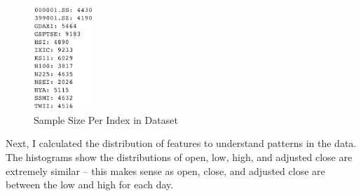 \documentclass[a4paper, 11pt]{article}
\begin{document}
\begin{figure}[H]
    \begin{center}
        \includegraphics[width=0.2\textwidth]{Sample Size Per Index.png}
        \caption{Sample Size Per Index in Dataset}
    \end{center}
\end{figure}

Next, I calculated the distribution of features to understand patterns in the data. The histograms show the distributions of open, low, high, and adjusted close are extremely similar -- this makes sense as open, close, and adjusted close are between the low and high for each day.
\end{document}
